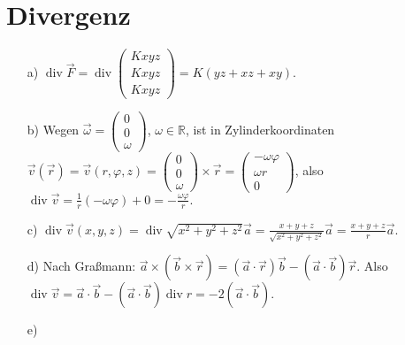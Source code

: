 \documentclass[11pt]{article}
\theoremstyle{plain}
\theoremstyle{definition}
\theoremstyle{remark}
\newcommand{\R}{\mathbb{R}}
\newcommand{\ph}{\varphi}
\begin{document}
\section{Divergenz}

\begin{itemize}
\item[a)] 
$ \operatorname{div} \vec{F} 
= \operatorname{div} 
	\begin{pmatrix} Kxyz \\ Kxyz \\ Kxyz \end{pmatrix} 
= K ( yz + xz + xy ). $ 
\item[b)] 
Wegen $ \vec{\omega} = \begin{pmatrix} 0 \\ 0 \\ \omega \end{pmatrix} $, 
$ \omega \in \R $, ist in Zylinderkoordinaten $ \vec{v} (\vec{r}) = \vec v (r,\ph,z)
= \begin{pmatrix} 0 \\ 0 \\ \omega \end{pmatrix} \times \vec{r} 
= \begin{pmatrix} - \omega \ph \\ \omega r \\ 0 \end{pmatrix} $, also 
$ \operatorname{div} \vec v 
= \frac{1}{r} (- \omega \ph) +0 = - \frac{\omega \ph}{r}. $ 
\item[c)] 
$ \operatorname{div} \vec{v} (x,y,z) 
= \operatorname{div} \sqrt{x^2+y^2+z^2} \vec{a} 
= \frac{x+y+z}{\sqrt{x^2+y^2+z^2}} \vec{a} 
= \frac{x+y+z}{r} \vec{a}. $ 
\item[d)] 
Nach Graßmann: $ \vec a \times (\vec b \times \vec r) = (\vec a \cdot \vec r) \vec b - (\vec a \cdot \vec b) \vec r $. 
Also $ \operatorname{div} \vec{v} 
= \vec a \cdot \vec b - (\vec a \cdot \vec b) \operatorname{div} r = -2 (\vec a \cdot \vec b). $ 
\item[e)]  

\end{itemize}
\end{document}
